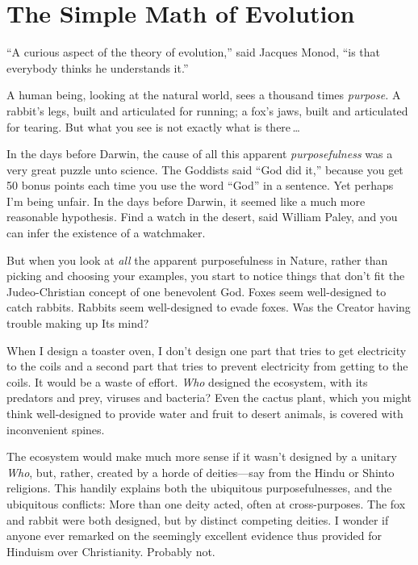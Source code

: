 \myendsectiontext

\chapter{The Simple Math of Evolution}



 ``A curious aspect of the theory of
evolution,'' said Jacques Monod,
``is that everybody thinks he understands
it.'' 


 A human being, looking at the natural world, sees a thousand times
\textit{purpose.} A rabbit's legs, built and
articulated for running; a fox's jaws, built and
articulated for tearing. But what you see is not exactly what is there\,\ldots


 In the days before Darwin, the cause of all this apparent
\textit{purposefulness} was a very great puzzle unto science. The
Goddists said ``God did it,''
because you get 50 bonus points each time you use the word
``God'' in a sentence. Yet perhaps
I'm being unfair. In the days before Darwin, it seemed
like a much more reasonable hypothesis. Find a watch in the desert,
said William Paley, and you can infer the existence of a watchmaker.


 But when you look at \textit{all} the apparent purposefulness in
Nature, rather than picking and choosing your examples, you start to
notice things that don't fit the Judeo-Christian
concept of one benevolent God. Foxes seem well-designed to catch
rabbits. Rabbits seem well-designed to evade foxes. Was the Creator
having trouble making up Its mind?


 When I design a toaster oven, I don't design one
part that tries to get electricity to the coils and a second part that
tries to prevent electricity from getting to the coils. It would be a
waste of effort. \textit{Who} designed the ecosystem, with its
predators and prey, viruses and bacteria? Even the cactus plant, which
you might think well-designed to provide water and fruit to desert
animals, is covered with inconvenient spines.


 The ecosystem would make much more sense if it
wasn't designed by a unitary \textit{Who}, but, rather,
created by a horde of deities---say from the Hindu or Shinto religions.
This handily explains both the ubiquitous purposefulnesses, and the
ubiquitous conflicts: More than one deity acted, often at
cross-purposes. The fox and rabbit were both designed, but by distinct
competing deities. I wonder if anyone ever remarked on the seemingly
excellent evidence thus provided for Hinduism over Christianity.
Probably not.


